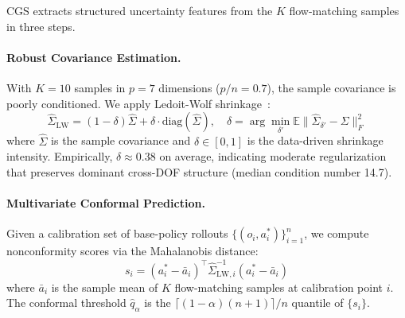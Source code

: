 \documentclass[10pt,letterpaper]{article}
\newcommand{\cgs}{CGS}
\begin{document}
\cgs{} extracts structured uncertainty features from the $K$ flow-matching samples in three steps.

\paragraph{Robust Covariance Estimation.}
With $K{=}10$ samples in $p{=}7$ dimensions ($p/n{=}0.7$), the sample covariance is poorly conditioned.
We apply Ledoit-Wolf shrinkage~\cite{ledoitwolf}:
\begin{equation}
    \hat{\Sigma}_{\text{LW}} = (1-\delta)\hat{\Sigma} + \delta \cdot \text{diag}(\hat{\Sigma}), \quad \delta = \arg\min_{\delta'} \mathbb{E}\|\hat{\Sigma}_{\delta'} - \Sigma\|_F^2
\end{equation}
where $\hat{\Sigma}$ is the sample covariance and $\delta \in [0,1]$ is the data-driven shrinkage intensity.
Empirically, $\delta \approx 0.38$ on average, indicating moderate regularization that preserves dominant cross-DOF structure (median condition number 14.7).

\paragraph{Multivariate Conformal Prediction.}
Given a calibration set of base-policy rollouts $\{(o_i, a_i^*)\}_{i=1}^n$, we compute nonconformity scores via the Mahalanobis distance:
\begin{equation}
    s_i = (a_i^* - \bar{a}_i)^\top \hat{\Sigma}_{\text{LW},i}^{-1} (a_i^* - \bar{a}_i)
\end{equation}
where $\bar{a}_i$ is the sample mean of $K$ flow-matching samples at calibration point $i$.
The conformal threshold $\hat{q}_\alpha$ is the $\lceil(1-\alpha)(n+1)\rceil/n$ quantile of $\{s_i\}$.
\end{document}
